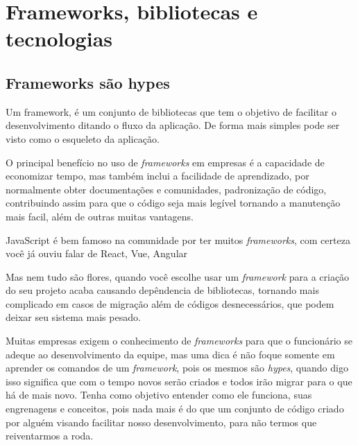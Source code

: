 \documentclass[
	12pt,				%
	openright,			%
	twoside,			%
	a4paper,			%
	english,			%
	brazil				%
	]{abntex2}
\begin{document}
\part{Frameworks, bibliotecas e tecnologias}
\chapter{Frameworks são hypes}

Um framework, é um conjunto de bibliotecas que tem o objetivo de facilitar o desenvolvimento ditando o fluxo da aplicação. De forma mais simples pode ser visto como o esqueleto da aplicação.

O principal benefício no uso de \textit{frameworks} em empresas é a capacidade de economizar tempo, mas também inclui a facilidade de aprendizado, por normalmente obter documentações e comunidades, padronização de código, contribuindo assim para que o código seja mais legível tornando a manutenção mais facil, além de outras muitas vantagens.

JavaScript é bem famoso na comunidade por ter muitos \textit{frameworks}, com certeza você já ouviu falar de React, Vue, Angular

Mas nem tudo são flores, quando você escolhe usar um \textit{framework} para a criação do seu projeto acaba causando depêndencia de bibliotecas, tornando mais complicado em casos de migração além de códigos desnecessários, que podem deixar seu sistema mais pesado.

Muitas empresas exigem o conhecimento de \textit{frameworks} para que o funcionário se adeque ao desenvolvimento da equipe, mas uma dica é não foque somente em aprender os comandos de um \textit{framework}, pois os mesmos são \textit{hypes}, quando digo isso significa que com o tempo novos serão criados e todos irão migrar para o que há de mais novo. Tenha como objetivo entender como ele funciona, suas engrenagens e conceitos, pois nada mais é do que um conjunto de código criado por alguém visando facilitar nosso desenvolvimento, para não termos que reiventarmos a roda.
\end{document}
